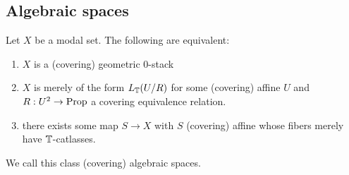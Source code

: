 



\subsection{Algebraic spaces}



%
\begin{theorem}
	Let $X$ be a modal set. The following are equivalent:
	\begin{enumerate}
		\item $X$ is a (covering) geometric 0-stack
		\item $X$ is merely of the form $L_{\mathbb{T}} (U / R)$ for some (covering) affine $U$ and  $R : U^2 \to \operatorname{Prop}$ a covering equivalence relation. 
		\item there exists some map $S \to X$ with $S$ (covering) affine whose fibers merely have $\mathbb{T}$-catlasses.
	\end{enumerate}
	We call this class (covering) algebraic spaces.
\end{theorem}

